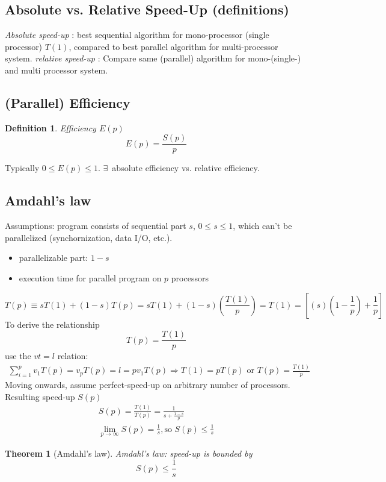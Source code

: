 \documentclass[10pt]{amsart}
\newtheorem{theorem}{Theorem}
\newtheorem{definition}{Definition}
\begin{document}
\begin{multicols*}{2}
\subsection{Absolute vs. Relative Speed-Up (definitions)}
\emph{Absolute speed-up} : best sequential algorithm for mono-processor (single processor) $T(1)$, compared to best parallel algorithm for multi-processor system.  
\emph{relative speed-up} : Compare same (parallel) algorithm for mono-(single-) and multi processor system.  
\subsection{(Parallel) Efficiency}
\begin{definition}
	Efficiency $E(p)$
	\begin{equation}
	E(p) = \frac{S(p)}{p}
	\end{equation}
\end{definition}
Typically $0\leq E(p) \leq 1$.  
$\exists \, $ absolute efficiency vs. relative efficiency.  
\subsection{Amdahl's law}
Assumptions: program consists of sequential part $s$, $0\leq s \leq 1$, which can't be parallelized (synchornization, data I/O, etc.).  
\begin{itemize}
	\item parallelizable part: $1-s$  
	\item execution time for parallel program on $p$ processors
\end{itemize}
\begin{equation}
T(p) \equiv s T(1) + (1-s) T(p) = sT(1) + (1-s) \left( \frac{T(1)}{p} \right) = T(1) = \left[ (s) \left( 1 - \frac{1}{p} \right) + \frac{1}{p} \right]
\end{equation}
To derive the relationship
\begin{equation}
T(p) = \frac{T(1)}{p}
\end{equation}
use the $vt=l$ relation:
\[
\begin{gathered}
\sum_{i=1}^p v_1 T(p) = v_p T(p) = l = pv_1T(p) \Longrightarrow T(1) = pT(p) \text{ or } T(p) = \frac{T(1)}{p}
\end{gathered}
\]
Moving onwards, assume perfect-speed-up on arbitrary number of processors.  
Resulting speed-up $S(p)$ 
\begin{equation}
\begin{gathered}
S(p) = \frac{T(1)}{T(p)} = \frac{1}{ s + \frac{1-s}{p} }   \\
\lim_{p\to \infty} S(p) = \frac{1}{s} , \text{so } S(p) \leq \frac{1}{s}
\end{gathered}
\end{equation}
\begin{theorem}[Amdahl's law]
	Amdahl's law: speed-up is bounded by 
	\begin{equation}
	\boxed{	S(p) \leq \frac{1}{s} }
	\end{equation}
\end{theorem}

\end{multicols*}
\end{document}
